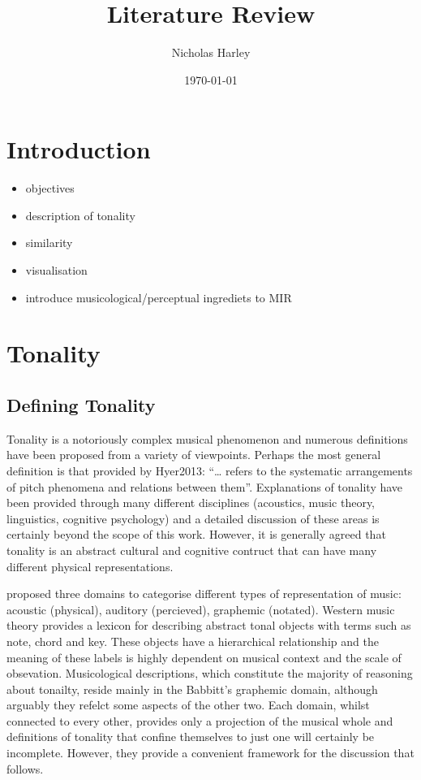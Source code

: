 \documentclass{article}
\title{Literature Review}
\author{Nicholas Harley}
\date{\today}
\begin{document}
\maketitle

\setcounter{tocdepth}{3}
\tableofcontents
\vspace*{1cm}

\section{Introduction}
\label{sec-1}

\begin{itemize}
\item objectives
\item description of tonality
\item similarity
\item visualisation
\item introduce musicological/perceptual ingrediets to MIR
\end{itemize}
\section{Tonality}
\label{sec-2}
\subsection{Defining Tonality}
\label{sec-2-1}

Tonality is a notoriously complex musical phenomenon and numerous
definitions have been proposed from a variety of viewpoints. Perhaps
the most general definition is that provided by Hyer2013: ``\ldots{} refers
to the systematic arrangements of pitch phenomena and relations
between them''. Explanations of tonality have been provided through
many different disciplines (acoustics, music theory, linguistics,
cognitive psychology) and a detailed discussion of these areas is
certainly beyond the scope of this work. However, it is generally
agreed that tonality is an abstract cultural and cognitive contruct
that can have many different physical representations.

\citep{Babbitt1965} proposed three domains to categorise different
types of representation of music: acoustic (physical), auditory
(percieved), graphemic (notated). Western music theory provides a
lexicon for describing abstract tonal objects with terms such as note,
chord and key. These objects have a hierarchical relationship and the
meaning of these labels is highly dependent on musical context and the
scale of obsevation. Musicological descriptions, which constitute the
majority of reasoning about tonailty, reside mainly in the Babbitt's
graphemic domain, although arguably they refelct some aspects of the
other two. Each domain, whilst connected to every other, provides only
a projection of the musical whole and definitions of tonality that
confine themselves to just one will certainly be incomplete. However,
they provide a convenient framework for the discussion that follows.
\end{document}
